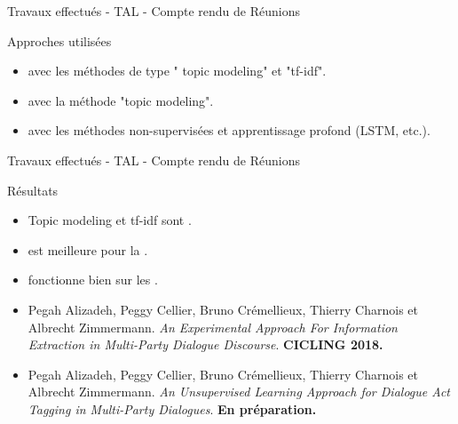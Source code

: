 \documentclass{beamer}
\newcommand{\imp}[1]{\textbf{{\color{blue}{#1}}}}
\begin{document}
{{\begin{frame}{Travaux effectués - TAL - Compte rendu de Réunions }
\begin{block}{Approches utilisées}
\begin{itemize}
	\item \imp{Regroupement des réunions} avec les méthodes de type " topic modeling" et "tf-idf".
	\item \imp{Caractérisation de chaque réunion} avec la méthode "topic modeling". 
	\item \imp{Identification des actes de dialogue} avec les méthodes non-supervisées et apprentissage profond (LSTM, etc.).
\end{itemize}
\end{block}
\end{frame}


\begin{frame}{Travaux effectués - TAL - Compte rendu de Réunions }

\begin{block}{Résultats}
\begin{itemize}
\item Topic modeling  et tf-idf sont \imp{complémentaires}. 
\item \imp{Topic modeling} est meilleure pour la \imp{synthèse et l'extraction de thèmes}.
\item \imp{tf-idf} fonctionne bien sur les \imp{caractérisations de réunions}.
\end{itemize}
\end{block}

\begin{itemize}
\small
\item Pegah Alizadeh, Peggy Cellier, Bruno Crémellieux, Thierry Charnois et Albrecht Zimmermann. \textit{An Experimental Approach For Information Extraction in Multi-Party Dialogue Discourse}. \textbf{CICLING 2018.}
\item Pegah Alizadeh, Peggy Cellier, Bruno Crémellieux, Thierry Charnois et Albrecht Zimmermann. \textit{An Unsupervised Learning Approach for Dialogue Act Tagging in Multi-Party Dialogues}. \textbf{En préparation.}
\end{itemize}

\end{frame}

}}
\end{document}

